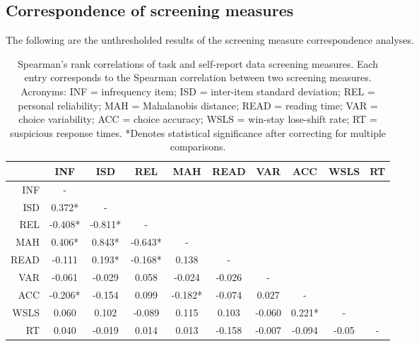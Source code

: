 \documentclass[a4paper,notitlepage,12pt]{article}
\begin{document}
\begin{refsection}[supp]
\clearpage

\subsection*{Correspondence of screening measures}

The following are the unthresholded results of the screening measure correspondence analyses.

\begin{table}[H]
\centering
\small
\begin{tabular}{rccccccccc}
\toprule
{} &      INF &      ISD &      REL &      MAH &    READ &     VAR &     ACC &   WSLS & RT \\
\midrule
INF  &        - &          &          &          &         &         &         &        &    \\
ISD  &   0.372* &        - &          &          &         &         &         &        &    \\
REL  &  -0.408* &  -0.811* &        - &          &         &         &         &        &    \\
MAH  &   0.406* &   0.843* &  -0.643* &        - &         &         &         &        &    \\
READ &   -0.111 &   0.193* &  -0.168* &    0.138 &       - &         &         &        &    \\
VAR  &   -0.061 &   -0.029 &    0.058 &   -0.024 &  -0.026 &       - &         &        &    \\
ACC  &  -0.206* &   -0.154 &    0.099 &  -0.182* &  -0.074 &   0.027 &       - &        &    \\
WSLS &    0.060 &    0.102 &   -0.089 &    0.115 &   0.103 &  -0.060 &  0.221* &      - &    \\
RT   &    0.040 &   -0.019 &    0.014 &    0.013 &  -0.158 &  -0.007 &  -0.094 &  -0.05 &  - \\
\bottomrule
\end{tabular}
\captionsetup{width=0.88\textwidth}
\caption{Spearman's rank correlations of task and self-report data screening measures. Each entry corresponds to the Spearman correlation between two screening measures. Acronyms: INF = infrequency item; ISD = inter-item standard deviation; REL = personal reliability; MAH = Mahalanobis distance; READ = reading time; VAR = choice variability; ACC = choice accuracy; WSLS = win-stay lose-shift rate; RT = suspicious response times. *Denotes statistical significance after correcting for multiple comparisons.}
\end{table}


\end{refsection}
\end{document}
